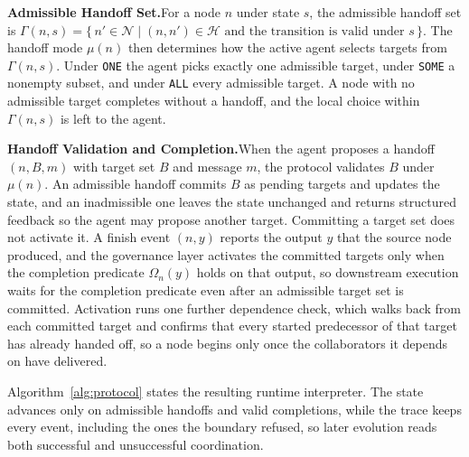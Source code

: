 \documentclass{article} %
\begin{document}
\textbf{Admissible Handoff Set.}\quad For a node $n$ under state $s$, the admissible handoff set is $\Gamma(n,s) = \{\, n' \in \mathcal{N} \mid (n,n') \in \mathcal{H} \text{ and the transition is valid under } s \,\}$. The handoff mode $\mu(n)$ then determines how the active agent selects targets from $\Gamma(n,s)$. Under \texttt{ONE} the agent picks exactly one admissible target, under \texttt{SOME} a nonempty subset, and under \texttt{ALL} every admissible target. A node with no admissible target completes without a handoff, and the local choice within $\Gamma(n,s)$ is left to the agent.

\textbf{Handoff Validation and Completion.}\quad When the agent proposes a handoff $(n,B,m)$ with target set $B$ and message $m$, the protocol validates $B$ under $\mu(n)$. An admissible handoff commits $B$ as pending targets and updates the state, and an inadmissible one leaves the state unchanged and returns structured feedback so the agent may propose another target. Committing a target set does not activate it. A finish event $(n,y)$ reports the output $y$ that the source node produced, and the governance layer activates the committed targets only when the completion predicate $\Omega_n(y)$ holds on that output, so downstream execution waits for the completion predicate even after an admissible target set is committed. Activation runs one further dependence check, which walks back from each committed target and confirms that every started predecessor of that target has already handed off, so a node begins only once the collaborators it depends on have delivered.

Algorithm~\ref{alg:protocol} states the resulting runtime interpreter. The state advances only on admissible handoffs and valid completions, while the trace keeps every event, including the ones the boundary refused, so later evolution reads both successful and unsuccessful coordination.
\end{document}
